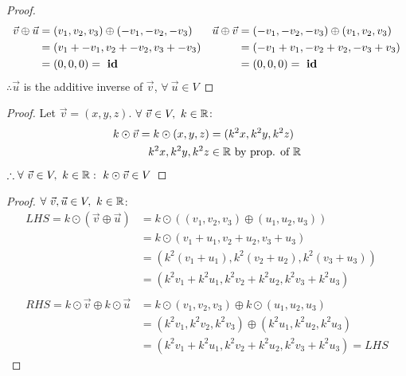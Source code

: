 \begin{enumerate}
\begin{proof}
    \begin{align*}
      \vec{v} \oplus \vec{u} & = (v_1,v_2,v_3) \oplus (-v_1,-v_2,-v_3) & \vec{u} \oplus \vec{v} & = (-v_1,-v_2,-v_3) \oplus (v_1,v_2,v_3) \\
                             & = (v_1+-v_1,v_2+-v_2,v_3+-v_3)          &                        & = (-v_1+v_1,-v_2+v_2,-v_3+v_3)          \\
                             & = (0,0,0) =~\text{\textbf{id}}             &                        & = (0,0,0) =~\text{\textbf{id}}
    \end{align*}
    $\therefore \vec{u}$ is the additive inverse of $\vec{v}$, $\forall~\vec{u} \in V$
  \end{proof}
  \begin{proof}
    Let $\vec{v}=(x,y,z)$. $\forall~\vec{v} \in V,~k \in \mathbb{R}$:
    \begin{align*}
      k \odot \vec{v} = k \odot (x,y,z) & = (k^2x,k^2y,k^2z)                   \\
      k^2x,k^2y,k^2z                    & \in \mathbb{R}~\text{by prop. of}~\mathbb{R}
    \end{align*}
    $\therefore \forall~\vec{v} \in V,~k \in \mathbb{R}:~k \odot \vec{v} \in V$
  \end{proof}
  \begin{proof}
    $\forall~\vec{v},\vec{u} \in V,~k \in \mathbb{R}$:
    \begin{align*}
      LHS = k \odot (\vec{v} \oplus \vec{u})       & = k \odot ((v_1,v_2,v_3) \oplus (u_1,u_2,u_3))         \\
                                                   & = k \odot (v_1+u_1,v_2+u_2,v_3+u_3)                    \\
                                                   & = (k^2(v_1+u_1), k^2(v_2+u_2), k^2(v_3+u_3))           \\
                                                   & = (k^2v_1+k^2u_1,k^2v_2+k^2u_2,k^2v_3+k^2u_3)          \\ \\
      RHS = k \odot \vec{v} \oplus k \odot \vec{u} & = k \odot (v_1,v_2,v_3) \oplus k \odot (u_1,u_2,u_3)   \\
                                                   & = (k^2v_1,k^2v_2,k^2v_3) \oplus (k^2u_1,k^2u_2,k^2u_3) \\
                                                   & = (k^2v_1+k^2u_1,k^2v_2+k^2u_2,k^2v_3+k^2u_3) = LHS
    \end{align*}

\end{proof}
\end{enumerate}
